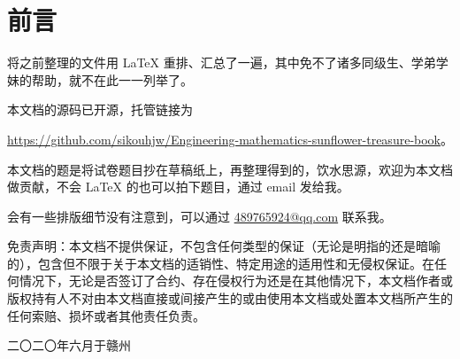 \chapter{前言}
将之前整理的文件用 \LaTeX{} 重排、汇总了一遍，其中免不了诸多同级生、学弟学妹的帮助，就不在此一一列举了。

本文档的源码已开源，托管链接为
\begin{center}
	\url{https://github.com/sikouhjw/Engineering-mathematics-sunflower-treasure-book}。
\end{center}

本文档的题是将试卷题目抄在草稿纸上，再整理得到的，饮水思源，欢迎为本文档做贡献，不会 \LaTeX{} 的也可以拍下题目，通过 email 发给我。

会有一些排版细节没有注意到，可以通过 \href{mailto:489765924@qq.com}{489765924@qq.com} 联系我。

免责声明：本文档不提供保证，不包含任何类型的保证（无论是明指的还是暗喻的），包含但不限于关于本文档的适销性、特定用途的适用性和无侵权保证。在任何情况下，无论是否签订了合约、存在侵权行为还是在其他情况下，本文档作者或版权持有人不对由本文档直接或间接产生的或由使用本文档或处置本文档所产生的任何索赔、损坏或者其他责任负责。
\begin{flushright}
	二〇二〇年六月于赣州
\end{flushright}
\newpage
